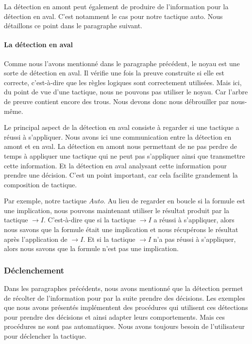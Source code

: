 \documentclass[titlepage]{article}
\begin{document}
La détection en amont peut également de produire de l'information pour la détection en aval. C'est notamment le cas pour notre tactique auto. Nous détaillons ce point dans le paragraphe suivant.

\paragraph{La détection en aval}
Comme nous l'avons mentionné dans le paragraphe précédent, le noyau est une sorte de détection en aval. Il vérifie une fois la preuve construite si elle est correcte, c'est-à-dire que les règles logiques sont correctement utilisées. Mais ici, du point de vue d'une tactique, nous ne pouvons pas utiliser le noyau. Car l'arbre de preuve contient encore des trous. Nous devons donc nous débrouiller par nous-même.

Le principal aspect de la détection en aval consiste à regarder si une tactique a réussi à s'appliquer. Nous avons ici une communication entre la détection en amont et en aval. La détection en amont nous permettant de ne pas perdre de temps à appliquer une tactique qui ne peut pas s'appliquer ainsi que transmettre cette information. Et la détection en aval analysant cette information pour prendre une décision. C'est un point important, car cela facilite grandement la composition de tactique.

Par exemple, notre tactique $Auto$. Au lieu de regarder en boucle si la formule est une implication, nous pouvons maintenant utiliser le résultat produit par la tactique $\to I$. C'est-à-dire que si la tactique $\to I$ a réussi à s'appliquer, alors nous savons que la formule était une implication et nous récupérons le résultat après l'application de $\to I$. Et si la tactique $\to I$ n'a pas réussi à s'appliquer, alors nous savons que la formule n'est pas une implication.

\subsubsection{Déclenchement} \label{Declenchement}
Dans les paragraphes précédents, nous avons mentionné que la détection permet de récolter de l'information pour par la suite prendre des décisions. Les exemples que nous avons présentés implémentent des procédures qui utilisent ces détections pour prendre des décisions et ainsi adapter leurs comportements. Mais ces procédures ne sont pas automatiques. Nous avons toujours besoin de l'utilisateur pour déclencher la tactique.
\end{document}
